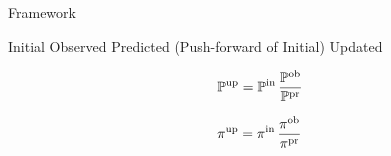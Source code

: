\begin{block}{Framework}

    \begin{itemize}
        \itembox{$ \initialP, \; \initial $} Initial
        \itembox{$ \observedP, \; \observed $} Observed
        \itembox{$ \predictedP, \; \predicted $} Predicted (Push-forward of Initial)
        \itembox{$ \updatedP, \; \updated $} Updated
    \end{itemize}

    \begin{equation}
        \dciP
    \end{equation}

    \begin{equation}
        \dciD
    \end{equation}

\end{block}


